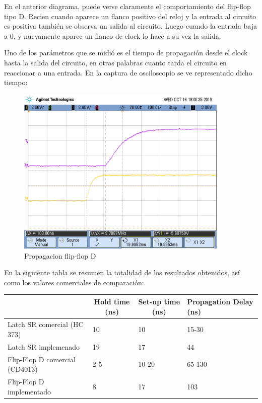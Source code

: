 En el anterior diagrama, puede verse claramente el comportamiento del flip-flop tipo D. Recien cuando aparece un flanco positivo del reloj y la entrada al circuito es positiva también se observa un salida al circuito. Luego cuando la entrada baja a $0$, y nuevamente aparec un flanco de clock lo hace a su vez la salida. 

Uno de los parámetros que se midió es el tiempo de propagación desde el clock hasta la salida del circuito, en otras palabras cuanto tarda el circuito en reaccionar a una entrada. En la captura de osciloscopio se ve representado dicho tiempo:


\begin{figure}[H]
	\centering
	\includegraphics[width=0.9\textwidth]{Ejercicio6/Recursos/propagacion_ffD.png}
	\caption{Propagacion flip-flop D}
\end{figure}


En la siguiente tabla se resumen la totalidad de los resultados obtenidos, as\'i como los valores comerciales de comparaci\'on:

\begin{table}[H]
\begin{tabular}{llll}\hline
\multicolumn{1}{c}{}           & \multicolumn{1}{c}{Hold time (ns)} & \multicolumn{1}{c}{Set-up time (ns)} & Propagation Delay (ns) \\
\hline
Latch SR comercial (HC 373)    & 10                                 & 10                                   & 15-30                  \\
Latch SR implemenado           & 19                              &   17                                   &  44                \\
Flip-Flop D comercial (CD4013) & 2-5                                & 10-20                                & 65-130                 \\
Flip-Flop D implementado       & 8    &         17                             &             103           \\  \hline
\end{tabular}
\end{table}


